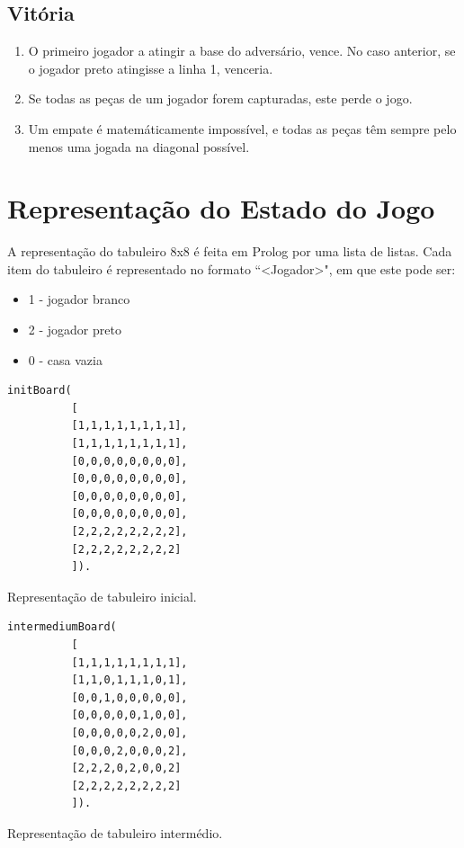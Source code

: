 \documentclass[15pt,a4paper]{article}
\begin{document}
\subsection{Vitória}
\begin{enumerate}
\item O primeiro jogador a atingir a base do adversário, vence. No caso anterior, se o jogador preto atingisse a linha 1, venceria.
\item Se todas as peças de um jogador forem capturadas, este perde o jogo.
\item Um empate é matemáticamente impossível, e todas as peças têm sempre pelo menos uma jogada na diagonal possível.
\end{enumerate}


 
\section{Representação do Estado do Jogo}
A representação do tabuleiro 8x8 é feita em Prolog por uma lista de listas.
Cada item do tabuleiro é representado no formato ``<Jogador>", em que este pode ser:
\begin{itemize}
\item 1 - jogador branco
\item 2 - jogador preto
\item 0 - casa vazia
\end{itemize}

\begin{code}[H]
	\begin{verbatim}
initBoard(
		  [
		  [1,1,1,1,1,1,1,1],
		  [1,1,1,1,1,1,1,1],
		  [0,0,0,0,0,0,0,0],
		  [0,0,0,0,0,0,0,0],
		  [0,0,0,0,0,0,0,0],
		  [0,0,0,0,0,0,0,0],
		  [2,2,2,2,2,2,2,2],
		  [2,2,2,2,2,2,2,2]
		  ]).
\end{verbatim}
\caption{Representação de tabuleiro inicial.}      
\end{code}

\begin{code}[H]
	\begin{verbatim}
intermediumBoard(
		  [
		  [1,1,1,1,1,1,1,1],
		  [1,1,0,1,1,1,0,1],
		  [0,0,1,0,0,0,0,0],
		  [0,0,0,0,0,1,0,0],
		  [0,0,0,0,0,2,0,0],
		  [0,0,0,2,0,0,0,2],
		  [2,2,2,0,2,0,0,2]
		  [2,2,2,2,2,2,2,2]
		  ]).
\end{verbatim}
\caption{Representação de tabuleiro intermédio.}
\end{code}
\end{document}
